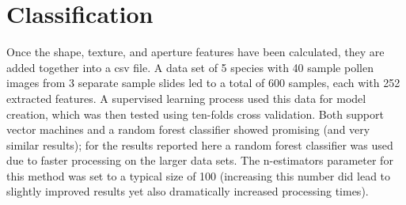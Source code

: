 \section{Classification}

Once the shape, texture, and aperture features have been calculated, they are added together into a csv file. A data set of 5 species with 40 sample pollen images from 3 separate sample slides led to a total of 600 samples, each with 252 extracted features. A supervised learning process used this data for model creation, which was then tested using ten-folds cross validation. Both support vector machines and a random forest classifier showed promising (and very similar results); for the results reported here a random forest classifier was used due to faster processing on the larger data sets. The n-estimators parameter for this method was set to a typical size of 100 (increasing this number did lead to slightly improved results yet also dramatically increased processing times).
    
  
  
  